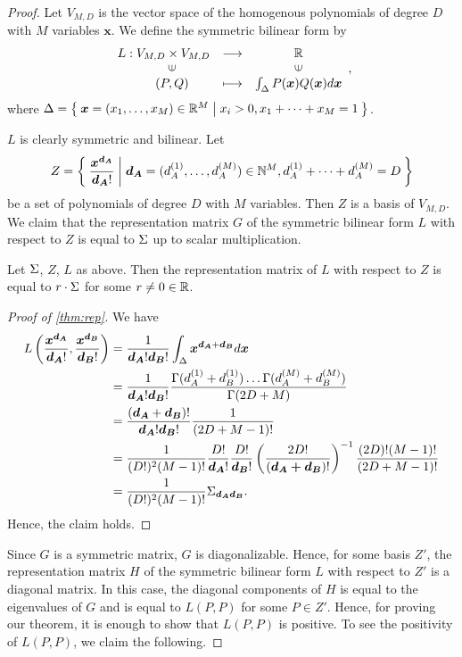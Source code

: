\documentclass{article}
\begin{document}
\begin{proof}
Let $V_{M, D}$ is the vector space of the homogenous polynomials of degree $D$ with $M$ variables $\bm{x}$.
We define the symmetric bilinear form  by
\[
\begin{array}{ccc}
L:V_{M, D} \times V_{M, D} & \longrightarrow & \R\\
\ \ \ \  \rotatebox{90}{$\in$}    &                 & \rotatebox{90}{$\in$} \\
\ \ \ \  (P, Q)                   & \longmapsto     & \int_{\Delta} P(\bm{x}) Q(\bm{x}) d\bm{x}
\end{array},
\]
where $\Delta = \Set{\bm{x} = (x_1, \dots, x_M) \in \mathbb{R}^M | x_i >0,  x_1 + \dots + x_M = 1}$.

$L$ is clearly symmetric and bilinear.
Let 
\[
    Z = \Set{\frac{\bm{x}^{\bm{d_A}}}{\bm{d_A}!} | \bm{d_A} = (d_A^{(1)}, \dots, d_A^{(M)}) \in \mathbb{N}^M, d_A^{(1)} + \dots + d_A^{(M)} = D}
\]
be a set of polynomials of degree $D$ with $M$ variables.
Then $Z$ is a basis of $V_{M, D}$.
We claim that the representation matrix $G$ of the symmetric bilinear form $L$ with respect to $Z$ is equal to $\Sigma$ up to scalar multiplication.

\begin{claim}\label{thm:rep}
Let $\Sigma$, $Z$, $L$ as above.
Then the representation matrix of $L$ with respect to $Z$ is equal to $r\cdot \Sigma$ for some $r \neq 0 \in \mathbb{R}$.
\end{claim}
\begin{proof}[Proof of \cref{thm:rep}]
We have
\begin{equation*}
\begin{split}
L\left( \frac{\bm{x}^{\bm{d_A}}}{\bm{d_A}!}, \frac{\bm{x}^{\bm{d_B}}}{\bm{d_B}!} \right)
  & = \frac{1}{\bm{d_A}!\bm{d_B}!}\int_{\Delta} \bm{x}^{\bm{d_A} + \bm{d_B}}d\bm{x}\\
  & = \frac{1}{\bm{d_A}!\bm{d_B}!} \frac{\Gamma(d_A^{(1)} + d_B^{(1)}) \dots \Gamma(d_A^{(M)} + d_B^{(M)}) }{\Gamma(2D + M)} \\
  & = \frac{(\bm{d_A} + \bm{d_B})!}{\bm{d_A}!\bm{d_B}!}\frac{1}{(2D + M - 1)!}\\
  & = \frac{1}{(D!)^2(M - 1)!} \frac{D!}{\bm{d_A}!} \frac{D!}{\bm{d_B}!} \left( \frac{2D!}{(\bm{d_A + \bm{d_B}})!} \right)^{-1} \frac{(2D)!(M - 1)!}{(2D + M - 1)!} \\
  & = \frac{1}{(D!)^2(M - 1)!} \Sigma_{\bm{d_A}\bm{d_B}}.
\end{split}
\end{equation*}
Hence, the claim holds.
\end{proof}
Since $G$ is a symmetric matrix, $G$ is diagonalizable.
Hence, for some basis $Z'$, the representation matrix $H$ of the symmetric bilinear form $L$ with respect to $Z'$ is a diagonal matrix.
In this case, the diagonal components of $H$ is equal to the eigenvalues of $G$ and is equal to $L(P, P)$ for some $P \in Z'$.
Hence, for proving our theorem, it is enough to show that $L(P, P)$ is positive.
To see the positivity of $L(P, P)$, we claim the following.


\end{proof}
\end{document}
